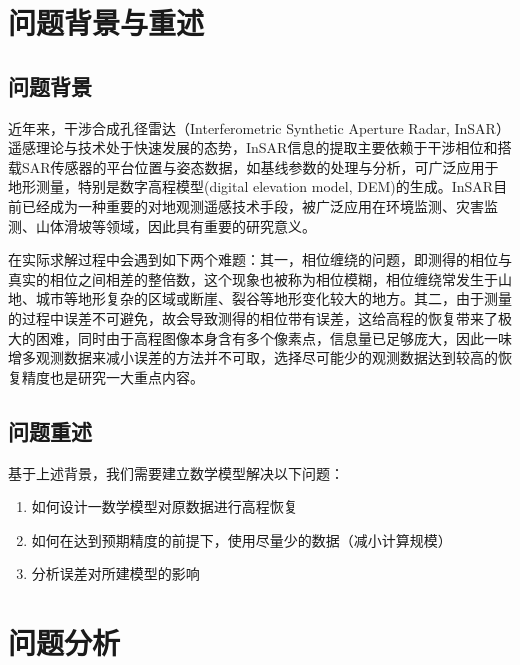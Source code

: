 \documentclass[a4paper]{article}
\begin{document}
	\section{问题背景与重述}
	\subsection{问题背景}

	近年来，干涉合成孔径雷达（Interferometric Synthetic Aperture Radar, InSAR）遥感理论与技术处于快速发展的态势，InSAR信息的提取主要依赖于干涉相位和搭载SAR传感器的平台位置与姿态数据，如基线参数的处理与分析，可广泛应用于地形测量，特别是数字高程模型(digital elevation model, DEM)的生成。InSAR目前已经成为一种重要的对地观测遥感技术手段，被广泛应用在环境监测、灾害监测、山体滑坡等领域，因此具有重要的研究意义。\par
	在实际求解过程中会遇到如下两个难题：其一，相位缠绕的问题，即测得的相位与真实的相位之间相差的整倍数，这个现象也被称为相位模糊，相位缠绕常发生于山地、城市等地形复杂的区域或断崖、裂谷等地形变化较大的地方。其二，由于测量的过程中误差不可避免，故会导致测得的相位带有误差，这给高程的恢复带来了极大的困难，同时由于高程图像本身含有多个像素点，信息量已足够庞大，因此一味增多观测数据来减小误差的方法并不可取，选择尽可能少的观测数据达到较高的恢复精度也是研究一大重点内容。
	
	
	\subsection{问题重述}
	
	基于上述背景，我们需要建立数学模型解决以下问题：

	\begin{enumerate}[itemindent=0.5cm]
		\item 如何设计一数学模型对原数据进行高程恢复
		\item 如何在达到预期精度的前提下，使用尽量少的数据（减小计算规模）
		\item 分析误差对所建模型的影响
	\end{enumerate}
	
	\section{问题分析}
\end{document}
